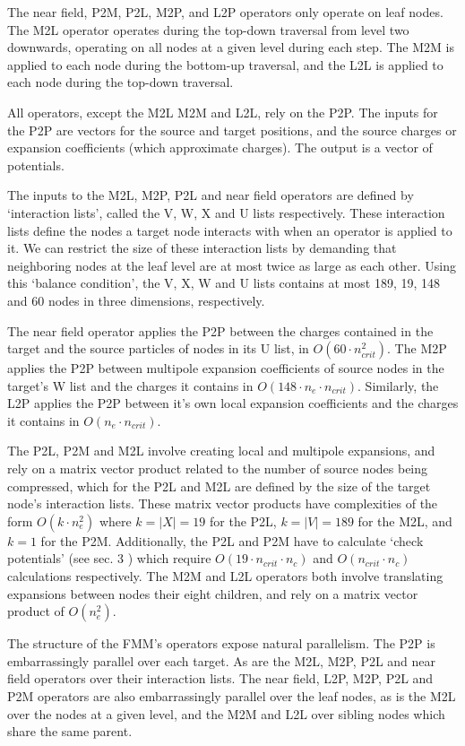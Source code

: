 \documentclass{IEEEcsmag}
\begin{document}
The near field, P2M, P2L, M2P, and L2P operators only operate on leaf nodes. The M2L operator operates during the top-down traversal from level two downwards, operating on all nodes at a given level during each step. The M2M is applied to each node during the bottom-up traversal, and the L2L is applied to each node during the top-down traversal. 

All operators, except the M2L M2M and L2L, rely on the P2P. The inputs for the P2P are vectors for the source and target positions, and the source charges or expansion coefficients (which approximate charges). The output is a vector of potentials. 

The inputs to the M2L, M2P, P2L and near field operators are defined by `interaction lists', called the V, W, X and U lists respectively. These interaction lists define the nodes a target node interacts with when an operator is applied to it. We can restrict the size of these interaction lists by demanding that neighboring nodes at the leaf level are at most twice as large as each other. Using this `balance condition', the V, X, W and U lists contains at most 189, 19, 148 and 60 nodes in three dimensions, respectively.

The near field operator applies the P2P between the charges contained in the target and the source particles of nodes in its U list, in $O(60 \cdot n_{crit}^2)$. The M2P applies the P2P between multipole expansion coefficients of source nodes in the target's W list and the charges it contains in $O(148 \cdot n_e \cdot n_{crit})$. Similarly, the L2P applies the P2P between it's own local expansion coefficients and the charges it contains in $O(n_e \cdot n_{crit})$.

The P2L, P2M and M2L involve creating local and multipole expansions, and rely on a matrix vector product related to the number of source nodes being compressed, which for the P2L and M2L are defined by the size of the target node's interaction lists. These matrix vector products have complexities of the form $O(k \cdot n_e^2)$ where $k = |X| = 19$ for the P2L, $k = |V| = 189$ for the M2L, and $k = 1$ for the P2M. Additionally, the P2L and P2M have to calculate `check potentials' (see sec. 3 \cite{Ying2004}) which require $O(19 \cdot n_{crit} \cdot n_c)$ and $O(n_{crit} \cdot n_c)$ calculations respectively. The M2M and L2L operators both involve translating expansions between nodes their eight children, and rely on a matrix vector product of $O(n_e^2)$.

The structure of the FMM's operators expose natural parallelism. The P2P is embarrassingly parallel over each target. As are the M2L, M2P, P2L and near field operators over their interaction lists. The near field, L2P, M2P, P2L and P2M operators are also embarrassingly parallel over the leaf nodes, as is the M2L over the nodes at a given level, and the M2M and L2L over sibling nodes which share the same parent.
\end{document}

